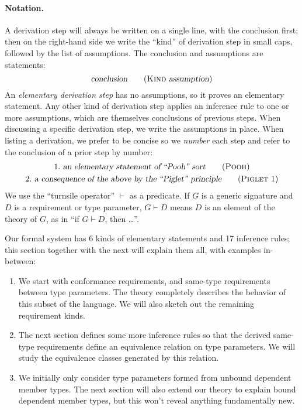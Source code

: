\documentclass[../generics]{subfiles}
\begin{document}
\paragraph{Notation.} A derivation step will always be written on a single line, with the conclusion first; then on the right-hand side we write the ``kind'' of derivation step in small caps, followed by the list of assumptions. The conclusion and assumptions are statements:
\[\textsl{conclusion}\tag{\textsc{Kind} \textsl{assumption}}\]
An \emph{elementary derivation step} has no assumptions, so it proves an elementary statement. Any other kind of derivation step applies an inference rule to one or more assumptions, which are themselves conclusions of previous steps. When discussing a specific derivation step, we write the assumptions in place. When listing a derivation, we prefer to be concise so we \emph{number} each step and refer to the conclusion of a prior step by number:
\begin{gather*}
1.\ \textsl{an elementary statement of ``Pooh'' sort}\tag{\textsc{Pooh}}\\
2.\ \textsl{a consequence of the above by the ``Piglet'' principle}\tag{\textsc{Piglet} 1}
\end{gather*}
We use the ``turnsile operator'' $\vdash$ as a predicate. If $G$ is a generic signature and $D$ is a requirement or type parameter, \index{$\vdash$}$G\vdash D$ means $D$ is an element of the theory of $G$, as in ``if $G\vdash D$, then \ldots''.

Our formal system has 6 kinds of elementary statements and 17 inference rules; this section together with the next will explain them all, with examples in-between:
\begin{enumerate}
\item We start with conformance requirements, and same-type requirements between type parameters. The theory completely describes the behavior of this subset of the language. We will also sketch out the remaining requirement kinds.
\item The next section defines some more inference rules so that the derived same-type requirements define an equivalence relation on type parameters. We will study the equivalence classes generated by this relation.
\item We initially only consider type parameters formed from unbound dependent member types. The next section will also extend our theory to explain bound dependent member types, but this won't reveal anything fundamentally new.
\end{enumerate}
\end{document}
